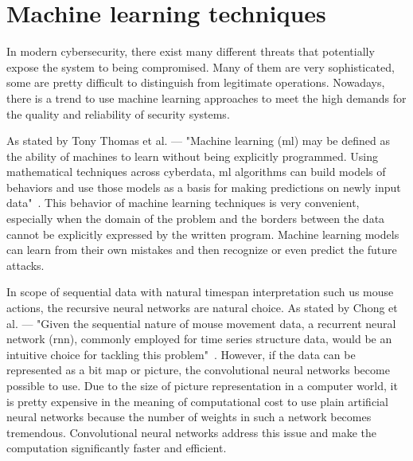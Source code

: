 \section{Machine learning techniques}\label{sec:machine-learning-techniques}
In modern cybersecurity, there exist many different threats that potentially expose the system to being compromised.
Many of them are very sophisticated, some are pretty difficult to distinguish from legitimate operations.
Nowadays, there is a trend to use machine learning approaches to meet the high demands for the quality and reliability of security systems.

As stated by Tony Thomas et al. --- "Machine learning (\gls{ml}) may be defined as the ability of machines to learn without being explicitly programmed.
Using mathematical techniques across cyberdata, \gls{ml} algorithms can build models of behaviors and use those models as a basis for making predictions on newly input data"~\cite{thomas2020machine}.
This behavior of machine learning techniques is very convenient, especially when the domain of the problem and the borders between the data cannot be explicitly expressed by the written program.
Machine learning models can learn from their own mistakes and then recognize or even predict the future attacks.

In scope of sequential data with natural timespan interpretation such us mouse actions, the recursive neural networks are natural choice.
As stated by Chong et al. --- "Given the sequential nature of mouse movement data, a recurrent neural network (\gls{rnn}), commonly employed for time series structure data, would be an intuitive choice for tackling this problem"~\cite{Main}.
However, if the data can be represented as a bit map or picture, the convolutional neural networks become possible to use.
Due to the size of picture representation in a computer world, it is pretty expensive in the meaning of computational cost to use plain artificial neural networks because the number of weights in such a network becomes tremendous.
Convolutional neural networks address this issue and make the computation significantly faster and efficient.


